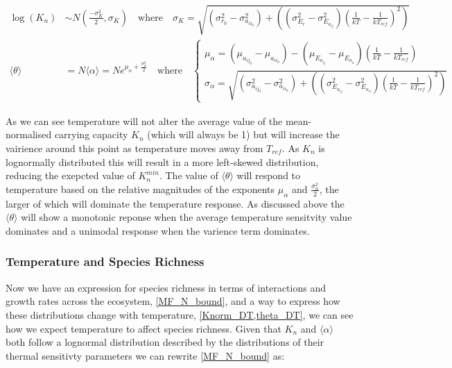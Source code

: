 \documentclass{article}
\begin{document}
\begin{align}
  \log(K_n) &\sim N(\frac{-\sigma_{K}^2}{2}, \sigma_{K})
   \quad \text{where} \quad \sigma_{K} =
   \sqrt{\left(\sigma_{r_0}^2 - \sigma_{a_{ii}_0}^2 \right) + \left( \left(\sigma_{E_r}^2 - \sigma_{E_{a_{ij}}}^2\right) \left(\frac{1}{kT} - \frac{1}{k T_{ref}} \right)^2 \right)} \label{Knorm_DT}
   \\
  \langle \theta \rangle &= N \langle \alpha \rangle = N e^{ \mu_{\alpha} + \frac{\sigma_{\alpha}^2}{2} }
  \quad \text{where} \quad
  \begin{cases}
    \mu_{\alpha}  = \left( \mu_{a_{ij}_0} - \mu_{a_{ii}_0} \right) -
                    \left( \mu_{E_{a_{ij}}} - \mu_{E_{a_{ii}}} \right)
                    \left(\frac{1}{kT} - \frac{1}{k T_{ref}} \right)
    \\
    \sigma_{\alpha} =  \sqrt{\left(\sigma_{a_{ij}_0}^2 - \sigma_{a_{ii}_0}^2 \right) + \left( \left(\sigma_{E_{a_{ij}}}^2 - \sigma_{E_{a_{ii}}}^2\right) \left(\frac{1}{kT} - \frac{1}{k T_{ref}} \right)^2 \right)}
  \end{cases} \label{theta_DT}
\end{align}

As we can see temperature will not alter the average value of the mean-normalised carrying capacity $K_n$ (which will always be 1) but will increase the vairience around this point as temperature moves away from $T_{ref}$. As $K_n$ is lognormally distributed this will result in a more left-skewed distribution, reducing the exepcted value of $K_n^{min}$. The value of $\langle \theta \rangle$ will respond to temperature based on the relative magnitudes of the exponents $\mu_{\alpha}$ and $\frac{\sigma_{\alpha}^2}{2}$, the larger of which will dominate the temperature response. As discussed above the $\langle \theta \rangle$ will show a monotonic reponse when the average temperature sensitvity value dominates and a unimodal response when the varience term dominates.

\subsubsection{Temperature and Species Richness}

Now we have an expression for species richness in terms of interactions and growth rates across the ecosystem, \cref{MF_N_bound}, and a way to express how these distributions change with temperature, \cref{Knorm_DT,theta_DT}, we can see how we expect temperature to affect species richness. Given that $K_n$ and $\langle \alpha \rangle$ both follow a lognormal distribution described by the distributions of their thermal sensitivty parameters we can rewrite \cref{MF_N_bound} as:
\end{document}
